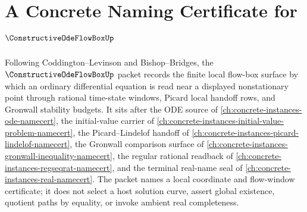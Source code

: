 \chapter{A Concrete Naming Certificate for $\ConstructiveOdeFlowBoxUp$}
\label{ch:concrete-instances-constructive-ode-flow-box-namecert}

Following Coddington--Levinson and Bishop--Bridges, the $\ConstructiveOdeFlowBoxUp$ packet records the finite local flow-box surface by which an ordinary differential equation is read near a displayed nonstationary point through rational time-state windows, Picard local handoff rows, and Gronwall stability budgets. It sits after the ODE source of \autoref{ch:concrete-instances-ode-namecert}, the initial-value carrier of \autoref{ch:concrete-instances-initial-value-problem-namecert}, the Picard--Lindelof handoff of \autoref{ch:concrete-instances-picard-lindelof-namecert}, the Gronwall comparison surface of \autoref{ch:concrete-instances-gronwall-inequality-namecert}, the regular rational readback of \autoref{ch:concrete-instances-regseqrat-namecert}, and the terminal real-name seal of \autoref{ch:concrete-instances-real-namecert}. The packet names a local coordinate and flow-window certificate; it does not select a host solution curve, assert global existence, quotient paths by equality, or invoke ambient real completeness.

